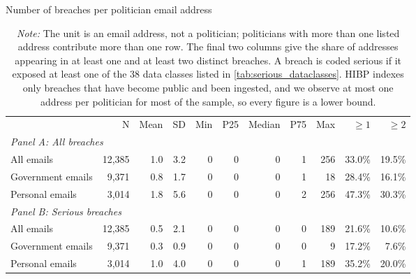 \begin{table}[!htbp]
\centering
\footnotesize
\def\sym#1{\ifmmode^{#1}\else\(^{#1}\)\fi}
\caption{Number of breaches per politician email address}
\label{tab:pooled_pols_breach_summary}
\begin{adjustbox}{max width=\linewidth}
\begin{tabular}{lrrrrrrrrrr}
\toprule\toprule
& N & Mean & SD & Min & P25 & Median & P75 & Max & $\geq 1$ & $\geq 2$ \\
\multicolumn{11}{l}{\emph{Panel A: All breaches}} \\
\midrule
All emails & 12,385 & 1.0 & 3.2 & 0 & 0 & 0 & 1 & 256 & 33.0\% & 19.5\% \\
Government emails & 9,371 & 0.8 & 1.7 & 0 & 0 & 0 & 1 & 18 & 28.4\% & 16.1\% \\
Personal emails & 3,014 & 1.8 & 5.6 & 0 & 0 & 0 & 2 & 256 & 47.3\% & 30.3\% \\
\midrule
\multicolumn{11}{l}{\emph{Panel B: Serious breaches}} \\
\midrule
All emails & 12,385 & 0.5 & 2.1 & 0 & 0 & 0 & 0 & 189 & 21.6\% & 10.6\% \\
Government emails & 9,371 & 0.3 & 0.9 & 0 & 0 & 0 & 0 & 9 & 17.2\% & 7.6\% \\
Personal emails & 3,014 & 1.0 & 4.0 & 0 & 0 & 0 & 1 & 189 & 35.2\% & 20.0\% \\
\bottomrule
\end{tabular}
\end{adjustbox}
\caption*{\scriptsize \emph{Note:} The unit is an email address, not a politician; politicians with more than one listed address contribute more than one row. The final two columns give the share of addresses appearing in at least one and at least two distinct breaches. A breach is coded serious if it exposed at least one of the 38 data classes listed in \cref{tab:serious_dataclasses}. HIBP indexes only breaches that have become public and been ingested, and we observe at most one address per politician for most of the sample, so every figure is a lower bound.}
\end{table}
